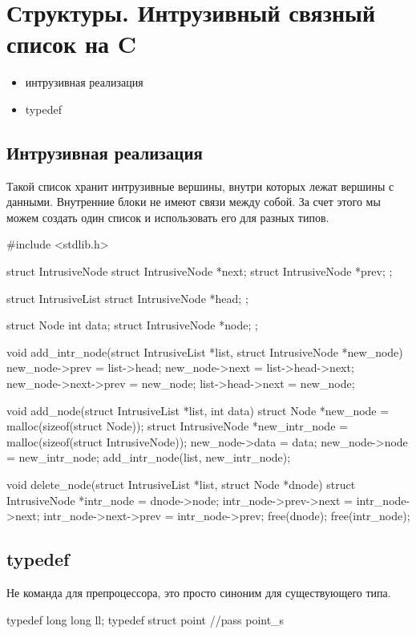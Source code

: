 % 
% 
\section{Структуры. Интрузивный связный список на C}
\begin{itemize}[noitemsep]
    \item интрузивная реализация
    \item typedef
\end{itemize}
\subsection{Интрузивная реализация}
Такой список хранит интрузивные вершины, внутри которых лежат вершины с данными. Внутренние блоки не имеют связи между собой. За счет этого мы можем создать один список и использовать его для разных типов.
\begin{ccode}
#include <stdlib.h>

struct IntrusiveNode {
    struct IntrusiveNode *next;
    struct IntrusiveNode *prev;
};

struct IntrusiveList {
    struct IntrusiveNode *head;
};

struct Node {
    int data;
    struct IntrusiveNode *node;
};

void add_intr_node(struct IntrusiveList *list, struct IntrusiveNode *new_node) {
    new_node->prev = list->head;
    new_node->next = list->head->next;
    new_node->next->prev = new_node;
    list->head->next = new_node;
}

void add_node(struct IntrusiveList *list, int data) {
    struct Node *new_node = malloc(sizeof(struct Node));
    struct IntrusiveNode *new_intr_node = malloc(sizeof(struct IntrusiveNode));
    new_node->data = data;
    new_node->node = new_intr_node;
    add_intr_node(list, new_intr_node); 
}

void delete_node(struct IntrusiveList *list, struct Node *dnode) {
    struct IntrusiveNode *intr_node = dnode->node;
    intr_node->prev->next = intr_node->next;
    intr_node->next->prev = intr_node->prev;
    free(dnode); free(intr_node);
}
\end{ccode}
\subsection{typedef}
Не команда для препроцессора, это просто синоним для существующего типа.
\begin{ccode}
typedef long long ll;
typedef struct point {
    //pass
} point_s
\end{ccode}
% 
